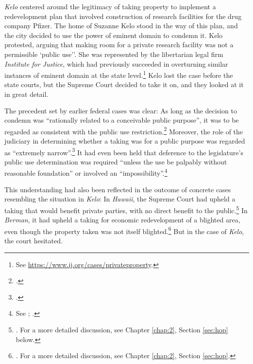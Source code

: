 {\it Kelo} centered around the legitimacy of taking property to implement a redevelopment plan that involved construction of research facilities for the drug company Pfizer. The home of Suzanne Kelo stood in the way of this plan, and the city decided to use the power of eminent domain to condemn it. Kelo protested, arguing that making room for a private research facility was not a permissible  `public use''. She was represented by the libertarian legal firm {\it Institute for Justice}, which had previously succeeded in overturning similar instances of eminent domain at the state level.\footnote{See \url{https://www.ij.org/cases/privateproperty}.} Kelo lost the case before the state courts, but the Supreme Court decided to take it on, and they looked at it in great detail.

The precedent set by earlier federal cases was clear: As long as the decision to condemn was ``rationally related to a conceivable public purpose'', it was to be regarded as consistent with the public use restriction.\footcite[241]{midkiff84} Moreover, the role of the judiciary in determining whether a taking was for a public purpose was regarded as ``extremely narrow''.\footcite[32]{berman54} It had even been held that deference to the legislature's public use determination was required ``unless the use be palpably without reasonable foundation'' or involved an ``impossibility''.\footnote{See \cite[66]{dominion25}; \cite[680]{gettysburg96}.}

This understanding had also been reflected in the outcome of concrete cases resembling the situation in {\it Kelo}: In {\it Hawaii}, the Supreme Court had upheld a taking that would benefit private parties, with no direct benefit to the public.\footnote{\cite{midkiff84}. For a more detailed discussion, see Chapter \ref{chap:2}, Section \ref{sec:hop} below.} In {\it Berman}, it had upheld a taking for economic redevelopment of a blighted area, even though the property taken was not itself blighted.\footnote{\cite{berman54}. For a more detailed discussion, see Chapter \ref{chap:2}, Section \ref{sec:hop}.} But in the case of {\it Kelo}, the court hesitated.

